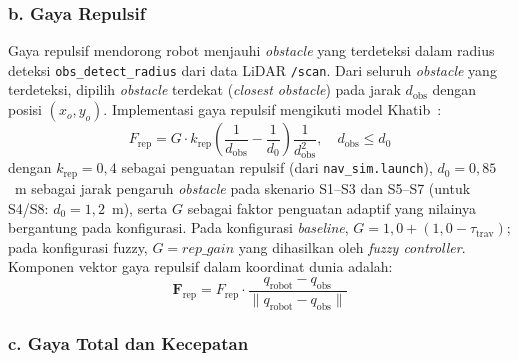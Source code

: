 \subsubsection*{b. Gaya Repulsif}

Gaya repulsif mendorong robot menjauhi \textit{obstacle} yang terdeteksi dalam radius deteksi \texttt{obs\_detect\_radius} dari data LiDAR \texttt{/scan}. Dari seluruh \textit{obstacle} yang terdeteksi, dipilih \textit{obstacle} terdekat (\textit{closest obstacle}) pada jarak $d_\text{obs}$ dengan posisi $(x_o, y_o)$. Implementasi gaya repulsif mengikuti model Khatib~\cite{Khatib1986}:
\begin{equation}
    F_\text{rep} = G \cdot k_\text{rep} \left(\frac{1}{d_\text{obs}} -
    \frac{1}{d_0}\right) \frac{1}{d_\text{obs}^2}, \quad d_\text{obs} \leq d_0
    \label{eq:f_rep_scalar}
\end{equation}
dengan $k_\text{rep} = 0{,}4$ sebagai penguatan repulsif (dari \texttt{nav\_sim.launch}), $d_0 = 0{,}85$~m sebagai jarak pengaruh \textit{obstacle} pada skenario S1--S3 dan S5--S7 (untuk S4/S8: $d_0 = 1{,}2$~m), serta $G$ sebagai faktor penguatan adaptif yang nilainya bergantung pada konfigurasi. Pada konfigurasi \textit{baseline}, $G = 1{,}0 + (1{,}0 - \tau_\text{trav})$; pada konfigurasi fuzzy, $G = \mathit{rep\_gain}$ yang dihasilkan oleh \textit{fuzzy controller}. Komponen vektor gaya repulsif dalam koordinat dunia adalah:
\begin{equation}
    \mathbf{F}_\text{rep} = F_\text{rep} \cdot
    \frac{q_\text{robot} - q_\text{obs}}{\|q_\text{robot} - q_\text{obs}\|}
    \label{eq:f_rep_vector}
\end{equation}

\subsubsection*{c. Gaya Total dan Kecepatan}


